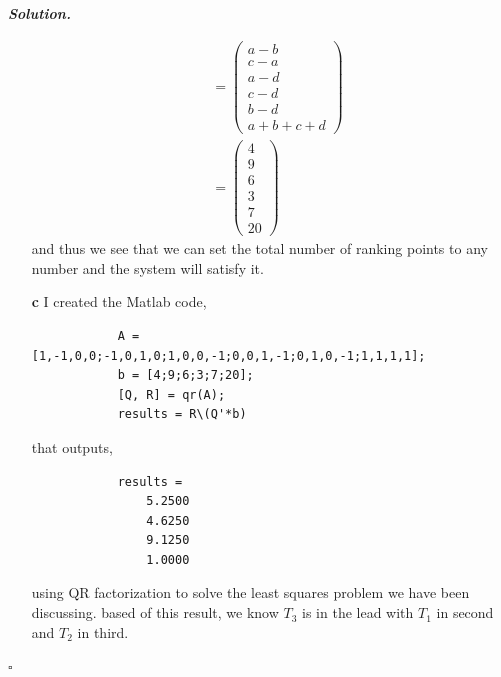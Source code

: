 \documentclass[12pt]{report}
\newenvironment{solution}[1][\it{Solution}]{\textbf{#1. } }{$\square$}
\begin{document}
\begin{solution}
\begin{enumerate}
\begin{align*}
            &= \begin{pmatrix}a-b\\ c-a\\ a-d\\ c-d\\ b-d\\ a+b+c+d\end{pmatrix}\\
            &= \begin{pmatrix}
                4\\9\\6\\3\\7\\20
            \end{pmatrix}
        \end{align*}
        and thus we see that we can set the total number of ranking points to any number and the system will satisfy it. 

        \item [{\bf c}]
        I created the Matlab code,
        \begin{verbatim}
            A = [1,-1,0,0;-1,0,1,0;1,0,0,-1;0,0,1,-1;0,1,0,-1;1,1,1,1];
            b = [4;9;6;3;7;20];
            [Q, R] = qr(A);
            results = R\(Q'*b)
        \end{verbatim}
        that outputs,
        \begin{verbatim}
            results =
                5.2500
                4.6250
                9.1250
                1.0000
        \end{verbatim}
        using QR factorization to solve the least squares problem we have been discussing. based of this result, we know $T_3$ is in the lead with $T_1$ in second and $T_2$ in third.
    \end{enumerate}
\end{solution}

\end{document}
